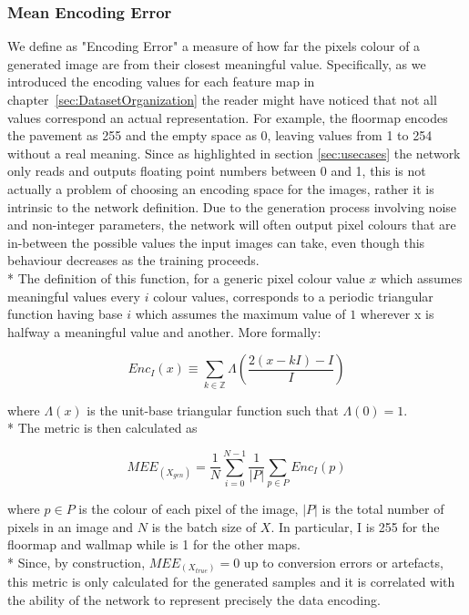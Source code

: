 \subsubsection{Mean Encoding Error}
We define as "Encoding Error" a measure of how far the pixels colour of a generated image are from their closest meaningful value. Specifically, as we introduced the encoding values for each feature map in chapter~\ref{sec:DatasetOrganization} the reader might have noticed that not all values correspond an actual representation. For example, the \gls{floormap} encodes the pavement as 255 and the empty space as 0, leaving values from 1 to 254 without a real meaning. Since as highlighted in section \ref{sec:usecases} the network only reads and outputs floating point numbers between 0 and 1, this is not actually a problem of choosing an encoding space for the images, rather it is intrinsic to the network definition. Due to the generation process involving noise and non-integer parameters, the network will often output pixel colours that are in-between the possible values the input images can take, even though this behaviour decreases as the training proceeds. \\*
The definition of this function, for a generic pixel colour value $x$ which assumes meaningful values every $i$ colour values, corresponds to a periodic triangular function having base $i$ which assumes the maximum value of $1$ wherever x is halfway a meaningful value and another. More formally:

\begin{equation}
Enc_{I}(x) \equiv \sum_{k \in \mathbb{Z}}^{} \Lambda (\frac{2(x-kI)-I}{I})
\end{equation}

where $ \Lambda(x) $ is the unit-base triangular function such that $ \Lambda(0) = 1 $. \\*
The metric is then calculated as 

\begin{equation}
MEE_(X_{gen}) = \frac{1}{N}\sum_{i=0}^{N-1} \frac{1}{|P|} \sum_{p\in P} Enc_I(p)
\end{equation}

where $p\in P$ is the colour of each pixel of the image, $|P|$ is the total number of pixels in an image and $N$ is the batch size of $X$. In particular, I is 255 for the \gls{floormap} and \gls{wallmap} while is 1 for the other maps.  \\*
Since, by construction, $MEE_(X_{true}) = 0$ up to conversion errors or artefacts, this metric is only calculated for the generated samples and it is correlated with the ability of the network to represent precisely the data encoding.

